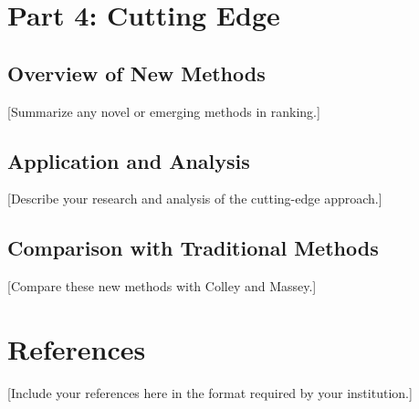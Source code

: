 \documentclass[12pt]{article}
\begin{document}
\section{Part 4: Cutting Edge}
\subsection{Overview of New Methods}
[Summarize any novel or emerging methods in ranking.]

\subsection{Application and Analysis}
[Describe your research and analysis of the cutting-edge approach.]

\subsection{Comparison with Traditional Methods}
[Compare these new methods with Colley and Massey.]

\newpage
\section*{References}
[Include your references here in the format required by your institution.]
\end{document}

